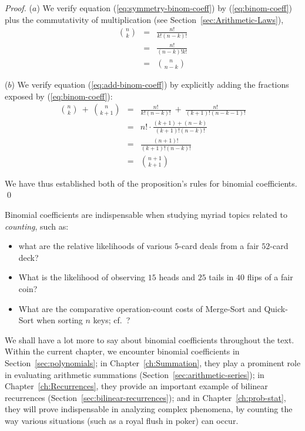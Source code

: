 \begin{proof}
($a$)
We verify equation (\ref{eq:symmetry-binom-coeff}) by
(\ref{eq:binom-coeff}) plus the commutativity of multiplication (see
Section~\ref{sec:Arithmetic-Laws}),
\begin{eqnarray*}
{n \choose k} & = & \frac{n!}{k!(n-k)!} \\
              & = & \frac{n!}{(n-k)!k!} \\
              & = & {n \choose {n-k}}
\end{eqnarray*}

\noindent ($b$)
We verify equation (\ref{eq:add-binom-coeff}) by explicitly adding the
fractions exposed by (\ref{eq:binom-coeff}):
\begin{eqnarray*}
{n \choose k} \ + \ {n \choose {k+1}}
  & = &
\frac{n!}{k!(n-k)!} \ + \ \frac{n!}{(k+1)!(n-k-1)!} \\
  & = &
n! \cdot \frac{(k+1) + (n-k)} {(k+1)!(n-k)!} \\
  & = & 
\frac{(n+1)!}{(k+1)!(n-k)!} \\
  & = &
{{n+1} \choose {k+1}}
\end{eqnarray*}

We have thus established  both of the proposition's rules for binomial coefficients.
\qed
\end{proof}

\bigskip

Binomial coefficients are indispensable when studying myriad topics
related to {\em counting}, such as:
\begin{itemize}
\item
what are the relative likelihoods of various $5$-card deals from a
fair $52$-card deck?
\item
What is the likelihood of observing $15$ {\sc head}s and $25$ {\sc
  tail}s in $40$ flips of a fair coin?
\item
What are the comparative operation-count costs of Merge-Sort and
Quick-Sort when sorting $n$ keys; cf.~\cite{CLRS}?
\end{itemize}

We shall have a lot more to say about binomial coefficients throughout
the text.  Within the current chapter, we encounter binomial
coefficients in Section~\ref{sec:polynomials}; in
Chapter~\ref{ch:Summation}, they play a prominent role in evaluating
arithmetic summations (Section~\ref{sec:arithmetic-series}); in
Chapter~\ref{ch:Recurrences}, they provide an important example of
bilinear recurrences (Section~\ref{sec:bilinear-recurrences}); and in
Chapter~\ref{ch:prob-stat}, they will prove indispensable in analyzing
complex phenomena, by counting the way various situations (such as a
royal flush in poker) can occur.


